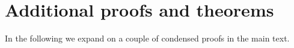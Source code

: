 \documentclass[11pt,english]{article}
\theoremstyle{plain}
\theoremstyle{plain}
\theoremstyle{plain}
\theoremstyle{plain}
\numberwithin{equation}{section}
\begin{document}
\section{Additional proofs and theorems}\label{appendix:general}
In the following we expand on a couple of condensed proofs in the main
text. %

\end{document}
